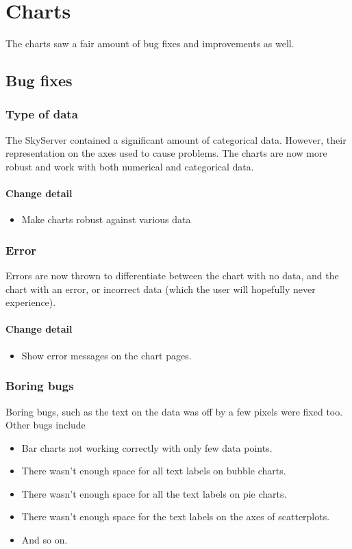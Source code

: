 \section{Charts}
The charts saw a fair amount of bug fixes and improvements as well.


\subsection{Bug fixes}
  \subsubsection{Type of data}
  The SkyServer contained a significant amount of categorical data. However, their representation on the axes
  used to cause problems. The charts are now more robust and work with both numerical and categorical data.
  
 \paragraph{Change detail}
\begin{itemize}
  \item Make charts robust against various data
\end{itemize}
  
 \subsubsection{Error}
  Errors are now thrown to differentiate between the chart with no data, and the chart with an error,
  or incorrect data (which the user will hopefully never experience). 
  
   \paragraph{Change detail}
\begin{itemize}
  \item Show error messages on the chart pages.
\end{itemize}
  
  \subsubsection{Boring bugs}
  Boring bugs, such as the text on the data was off by a few pixels were fixed too.
  Other bugs include 
  \begin{itemize}
  	\item Bar charts not working correctly with only few data points.
  	\item There wasn't enough space for all text labels on bubble charts.
  	\item There wasn't enough space for all the text labels on pie charts.
  	\item There wasn't enough space for the text labels on the axes of scatterplots.
  	\item And so on.
  \end{itemize}
  
